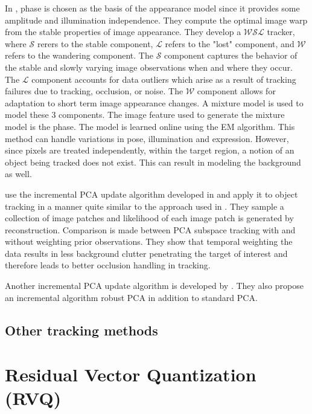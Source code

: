 \documentclass[12pt,letterpaper,doublespaced,ETD]{gt-ece-thesis} %
\begin{document}
\begin{Body}
In \cite{2003_JNL_TRKsubspace_Jepson}, phase is chosen as the basis of the appearance model since it provides some amplitude and illumination independence.  They compute the optimal image warp from the stable properties of image appearance.  They develop a $\mathcal{WSL}$ tracker, where $\mathcal{S}$ rerers to the stable component, $\mathcal{L}$ refers to the "lost" component, and $\mathcal{W}$ refers to the wandering component.  The $\mathcal{S}$ component captures the behavior of the stable and slowly varying image observations when and where they occur.  The $\mathcal{L}$ component accounts for data outliers which arise as a result of tracking failures due to tracking, occlusion, or noise.  The $\mathcal{W}$ component allows for adaptation to short term image appearance changes.  A mixture model is used to model these 3 components.  The image feature used to generate the mixture model is the phase.  The model is learned online using the EM algorithm.  This method can handle variations in pose, illumination and expression.  However, since pixels are treated independently, within the target region, a notion of an object being tracked does not exist.  This can result in modeling the background as well. 

\cite{2010_CNF_TRKsubs_Qian} use the incremental PCA update algorithm developed in \cite{2008_JNL_TRKsubs_Skocaj} and apply it to object tracking in a manner quite similar to the approach used in \cite{2008_JNL_subspaceTRK_Ross}.  They sample a collection of image patches and likelihood of each image patch is generated by reconstruction.  Comparison is made between PCA subspace tracking with and without weighting prior observations.  They show that temporal weighting the data results in less background clutter penetrating the target of interest and therefore leads to better occlusion handling in tracking.  

Another incremental PCA update algorithm is developed by \cite{2004_JNL_TRKsubs_Li}.  They also propose an incremental algorithm robust PCA in addition to standard PCA.




\section{Other tracking methods}



\chapter{Residual Vector Quantization (RVQ)}
\label{chap_RVQ}	










\end{Body}
\end{document}
